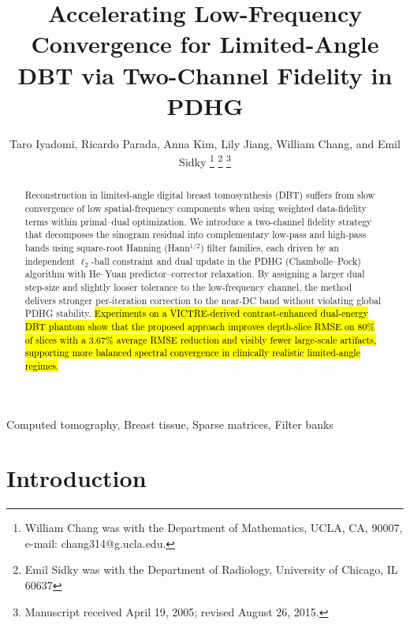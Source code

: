\documentclass[journal, a4paper]{IEEEtran}
\begin{document}
\title{Accelerating Low-Frequency Convergence for Limited-Angle DBT via Two-Channel Fidelity in PDHG}					%

\author{Taro Iyadomi,
        Ricardo Parada, Anna Kim, Lily Jiang, William Chang, and Emil Sidky %
\thanks{William Chang was with the Department of Mathematics, UCLA, CA, 90007, e-mail: chang314@g.ucla.edu.}%
\thanks{Emil Sidky was with the Department of Radiology, University of Chicago, IL 60637}%
\thanks{Manuscript received April 19, 2005; revised August 26, 2015.}}


\maketitle

\begin{abstract}
Reconstruction in limited-angle digital breast tomosynthesis (DBT) suffers from slow convergence of low spatial-frequency components when using weighted data-fidelity terms within primal–dual optimization. We introduce a two-channel fidelity strategy that decomposes the sinogram residual into complementary low-pass and high-pass bands using square-root Hanning (Hann$^{1/2}$) filter families, each driven by an independent $\ell_2$-ball constraint and dual update in the PDHG (Chambolle–Pock) algorithm with He–Yuan predictor–corrector relaxation. By assigning a larger dual step-size and slightly looser tolerance to the low-frequency channel, the method delivers stronger per-iteration correction to the near-DC band without violating global PDHG stability. \hl{Experiments on a VICTRE-derived contrast-enhanced dual-energy DBT phantom show that the proposed approach improves depth-slice RMSE on 80\% of slices with a $3.67\%$ average RMSE reduction and visibly fewer large-scale artifacts, supporting more balanced spectral convergence in clinically realistic limited-angle regimes.}
\end{abstract}


\begin{IEEEkeywords}
Computed tomography, Breast tissue, Sparse matrices, Filter banks
\end{IEEEkeywords}


\section{Introduction}
\end{document}
